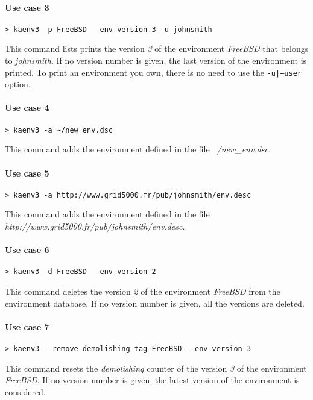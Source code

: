 \documentclass[a4wide,10pt,oneside]{book}
\begin{document}
\paragraph{Use case 3}
\begin{verbatim}
> kaenv3 -p FreeBSD --env-version 3 -u johnsmith
\end{verbatim}
This command lists prints the version \textit{3} of the environment \textit{FreeBSD} that belongs to \textit{johnsmith}. If no version number is given, the last version of the environment is printed. To print an environment you own, there is no need to use the \texttt{-u|--user} option.

\paragraph{Use case 4}
\begin{verbatim}
> kaenv3 -a ~/new_env.dsc
\end{verbatim}
This command adds the environment defined in the file \textit{~/new\_env.dsc}.

\paragraph{Use case 5}
\begin{verbatim}
> kaenv3 -a http://www.grid5000.fr/pub/johnsmith/env.desc
\end{verbatim}
This command adds the environment defined in the file \textit{http://www.grid5000.fr/pub/johnsmith/env.desc}.

\paragraph{Use case 6}
\begin{verbatim}
> kaenv3 -d FreeBSD --env-version 2
\end{verbatim}
This command deletes the version \textit{2} of the environment \textit{FreeBSD} from the environment database. If no version number is given, all the versions are deleted.

\paragraph{Use case 7}
\begin{verbatim}
> kaenv3 --remove-demolishing-tag FreeBSD --env-version 3
\end{verbatim}
This command resets the \textit{demolishing} counter of the version \textit{3} of the environment \textit{FreeBSD}. If no version number is given, the latest version of the environment is considered.
\end{document}
